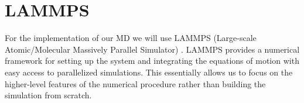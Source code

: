 











\section{LAMMPS}\label{sec:LAMMPS}
For the implementation of our \acrshort{MD} we will use LAMMPS (Large-scale Atomic/Molecular Massively Parallel Simulator) \cite{LAMMPS}. LAMMPS provides a numerical framework for setting up the system and integrating the equations of motion with easy access to parallelized simulations. This essentially allows us to focus on the higher-level features of the numerical procedure rather than building the simulation from scratch. 